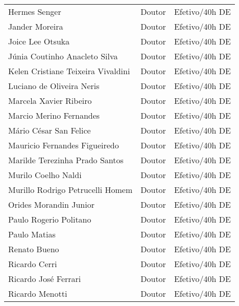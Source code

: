 \begin{singlespace}
\begin{longtable}{lcc}
        Hermes Senger                      & Doutor             & Efetivo/40h DE             \\
        Jander Moreira                     & Doutor             & Efetivo/40h DE             \\
        Joice Lee Otsuka                   & Doutor             & Efetivo/40h DE             \\
        Júnia Coutinho Anacleto Silva      & Doutor             & Efetivo/40h DE             \\
        Kelen Cristiane Teixeira Vivaldini & Doutor             & Efetivo/40h DE             \\
        Luciano de Oliveira Neris          & Doutor             & Efetivo/40h DE             \\
        Marcela Xavier Ribeiro             & Doutor             & Efetivo/40h DE             \\
        Marcio Merino Fernandes            & Doutor             & Efetivo/40h DE             \\
        Mário César San Felice             & Doutor             & Efetivo/40h DE             \\
        Mauricio Fernandes Figueiredo      & Doutor             & Efetivo/40h DE             \\
        Marilde Terezinha Prado Santos     & Doutor             & Efetivo/40h DE             \\
        Murilo Coelho Naldi                & Doutor             & Efetivo/40h DE             \\
        Murillo Rodrigo Petrucelli Homem   & Doutor             & Efetivo/40h DE             \\
        Orides Morandin Junior             & Doutor             & Efetivo/40h DE             \\
        Paulo Rogerio Politano             & Doutor             & Efetivo/40h DE             \\
        Paulo Matias                       & Doutor             & Efetivo/40h DE             \\
        Renato Bueno                       & Doutor             & Efetivo/40h DE             \\
        Ricardo Cerri                      & Doutor             & Efetivo/40h DE             \\
        Ricardo José Ferrari               & Doutor             & Efetivo/40h DE             \\
        Ricardo Menotti                    & Doutor             & Efetivo/40h DE             \\

\end{longtable}
\end{singlespace}
